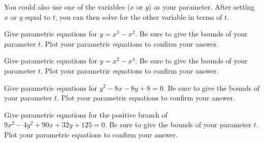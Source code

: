 You could also use one of the variables ($x$ or $y$) as your parameter. After setting $x$ or $y$ equal to $t$, you can then solve for the other variable in terms of $t$.

\question Give parametric equations for $y=x^3-x^2$. Be sure to give the bounds of your parameter $t$. Plot your parametric equations to confirm your answer.

\question Give parametric equations for $y=x^2-x^4$. Be sure to give the bounds of your parameter $t$. Plot your parametric equations to confirm your answer.

\question Give parametric equations for $y^2-8x-8y+8=0$. Be sure to give the bounds of your parameter $t$. Plot your parametric equations to confirm your answer.

\question Give parametric equations for the positive branch of $9x^2-4y^2+90x+32y+125=0$. Be sure to give the bounds of your parameter $t$. Plot your parametric equations to confirm your answer.



